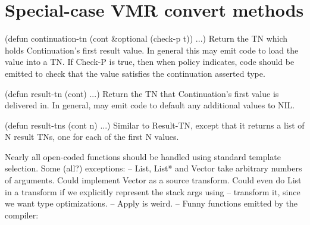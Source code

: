 
\section{Special-case VMR convert methods}

    (defun continuation-tn (cont \&optional (check-p t))
      ...)
Return the TN which holds Continuation's first result value.  In general
this may emit code to load the value into a TN.  If Check-P is true, then
when policy indicates, code should be emitted to check that the value satisfies
the continuation asserted type.

    (defun result-tn (cont)
      ...)
Return the TN that Continuation's first value is delivered in.  In general,
may emit code to default any additional values to NIL.

    (defun result-tns (cont n)
      ...)
Similar to Result-TN, except that it returns a list of N result TNs, one
for each of the first N values.


Nearly all open-coded functions should be handled using standard template
selection.  Some (all?) exceptions:
 -- List, List* and Vector take arbitrary numbers of arguments.  Could
    implement Vector as a source transform.  Could even do List in a transform
    if we explicitly represent the stack args using %
 -- %
    transform it, since we want %
    type optimizations.
 -- Apply is weird.
 -- Funny functions emitted by the compiler: %
